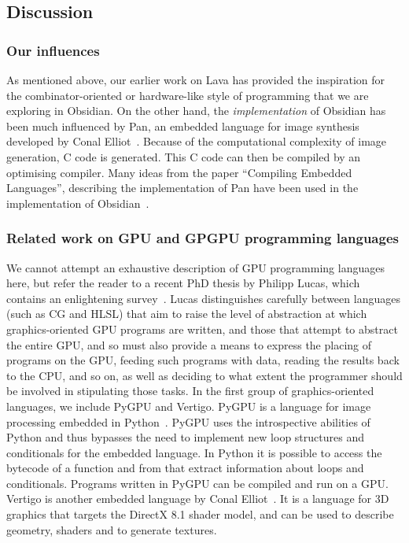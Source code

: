 
\subsection{Discussion} \label{sec:disc}
\subsubsection{Our influences}
As mentioned above, our earlier work on Lava has provided the inspiration for
the combinator-oriented or hardware-like style of programming that we are exploring in Obsidian.
On the other hand, the {\em implementation} of Obsidian has been much influenced by
{Pan}, an embedded language for image synthesis developed by 
Conal Elliot~\cite{PAN}. Because of the computational complexity of image generation, C 
code is generated. This C code can then be compiled by an optimising compiler. 
Many ideas from the paper 
``Compiling Embedded Languages'', describing the implementation of Pan have been 
used in the implementation of Obsidian~\cite{Elliott03:CompileDSEL-JFP}. 

\subsubsection{Related work on GPU and GPGPU programming languages}
We cannot attempt an exhaustive description of GPU programming languages here, but refer the reader to a recent PhD thesis by Philipp Lucas, which contains an enlightening survey~\cite{Lucas08}. Lucas distinguishes carefully between languages (such as CG and HLSL) that aim to raise the level of abstraction at which graphics-oriented GPU programs are written, and those that attempt to abstract the entire GPU, and so must also provide a means to express the placing of programs on the GPU, feeding such programs with data, reading the results back to the CPU, and so on, as well as deciding to what extent the programmer should be involved
in stipulating those tasks.
In the first group of graphics-oriented languages, we include PyGPU and Vertigo.
PyGPU is a language for image processing embedded in Python~\cite{LUNDPAPER}. 
PyGPU uses the introspective abilities of Python and thus bypasses
the need to implement new loop structures and conditionals for the embedded 
language. In Python it is possible to access the bytecode of a function and 
from that extract information about loops and conditionals. 
Programs written in PyGPU can be compiled and run on a GPU. 
Vertigo is another embedded language by Conal Elliot~\cite{VERTIGO}. It
is a language for 3D graphics that targets the DirectX 8.1 shader model, and
can be used to describe geometry, shaders and to generate textures. 

